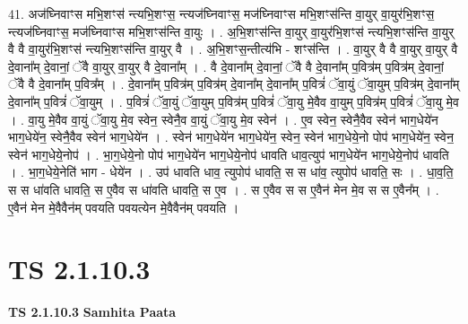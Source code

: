 \documentclass[17pt]{extarticle}
\begin{document}
41. अज॑घ्निवाꣳस मभि॒शꣳस॑ न्त्यभि॒शꣳस॒ न्त्यज॑घ्निवाꣳस॒ मज॑घ्निवाꣳस मभि॒शꣳस॑न्ति वा॒युर् वा॒युर॑भि॒शꣳस॒ न्त्यज॑घ्निवाꣳस॒ मज॑घ्निवाꣳस मभि॒शꣳस॑न्ति वा॒युः । . अ॒भि॒शꣳस॑न्ति वा॒युर् वा॒युर॑भि॒शꣳस॑ न्त्यभि॒शꣳस॑न्ति वा॒युर् वै वै वा॒युर॑भि॒शꣳस॑ न्त्यभि॒शꣳस॑न्ति वा॒युर् वै । . अ॒भि॒शꣳस॒न्तीत्य॑भि - शꣳस॑न्ति । . वा॒युर् वै वै वा॒युर् वा॒युर् वै दे॒वाना᳚म् दे॒वानां॒ ॅवै वा॒युर् वा॒युर् वै दे॒वाना᳚म् । . वै दे॒वाना᳚म् दे॒वानां॒ ॅवै वै दे॒वाना᳚म् प॒वित्र॑म् प॒वित्र॑म् दे॒वानां॒ ॅवै वै दे॒वाना᳚म् प॒वित्र᳚म् । . दे॒वाना᳚म् प॒वित्र॑म् प॒वित्र॑म् दे॒वाना᳚म् दे॒वाना᳚म् प॒वित्रं॑ ॅवा॒युं ॅवा॒युम् प॒वित्र॑म् दे॒वाना᳚म् दे॒वाना᳚म् प॒वित्रं॑ ॅवा॒युम् । . प॒वित्रं॑ ॅवा॒युं ॅवा॒युम् प॒वित्र॑म् प॒वित्रं॑ ॅवा॒यु मे॒वैव वा॒युम् प॒वित्र॑म् प॒वित्रं॑ ॅवा॒यु मे॒व । . वा॒यु मे॒वैव वा॒युं ॅवा॒यु मे॒व स्वेन॒ स्वेनै॒व वा॒युं ॅवा॒यु मे॒व स्वेन॑ । . ए॒व स्वेन॒ स्वेनै॒वैव स्वेन॑ भाग॒धेये॑न भाग॒धेये॑न॒ स्वेनै॒वैव स्वेन॑ भाग॒धेये॑न । . स्वेन॑ भाग॒धेये॑न भाग॒धेये॑न॒ स्वेन॒ स्वेन॑ भाग॒धेये॒नो पोप॑ भाग॒धेये॑न॒ स्वेन॒ स्वेन॑ भाग॒धेये॒नोप॑ । . भा॒ग॒धेये॒नो पोप॑ भाग॒धेये॑न भाग॒धेये॒नोप॑ धावति धाव॒त्युप॑ भाग॒धेये॑न भाग॒धेये॒नोप॑ धावति । . भा॒ग॒धेये॒नेति॑ भाग - धेये॑न । . उप॑ धावति धाव॒ त्युपोप॑ धावति॒ स स धा॑व॒ त्युपोप॑ धावति॒ सः । . धा॒व॒ति॒ स स धा॑वति धावति॒ स ए॒वैव स धा॑वति धावति॒ स ए॒व । . स ए॒वैव स स ए॒वैन॑ मेन मे॒व स स ए॒वैन᳚म् । . ए॒वैन॑ मेन मे॒वैवैन॑म् पवयति पवयत्येन मे॒वैवैन॑म् पवयति । \newline
\pagebreak
{}

\section{ TS 2.1.10.3 }

\textbf{TS 2.1.10.3 } \newline
\textbf{Samhita Paata} \newline
\end{document}
